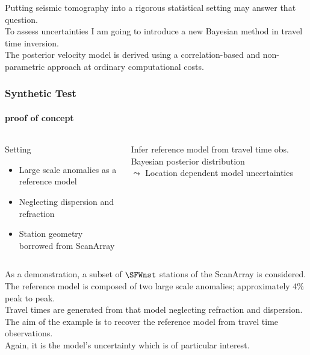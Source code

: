 \documentclass[aspectratio=169, t, 10pt,
    ]{beamer}
\begin{document}
Putting seismic tomography into a rigorous statistical setting may answer that question.
\\
To assess uncertainties I am going to introduce a new Bayesian method in travel time inversion.
\\
The posterior velocity model is derived using a correlation-based and non-parametric approach at ordinary computational costs.


\begin{frame}
    \frametitle{Synthetic Test}
    \framesubtitle{proof of concept}%
%
\begin{columns}%
%
%

    \begin{exampleblock}{Setting}
        \begin{itemize}
            \item Large scale anomalies as a reference model
            \item Neglecting dispersion and refraction
            \item Station geometry borrowed from ScanArray
        \end{itemize}
    \end{exampleblock}
    \medskip

    \begin{alertblock}{Infer reference model from travel time obs.}
        Bayesian posterior distribution \\
        \hfill {\large $\leadsto$} Location dependent model uncertainties ~
    \end{alertblock}

    \vspace{-10mm}
    
\end{columns}

\end{frame}

As a demonstration, a subset of $\SFWnst$ stations of the ScanArray is considered.
\\
The reference model is composed of two large scale anomalies; approximately 4\% peak to peak.
\\
Travel times are generated from that model neglecting refraction and dispersion.
\\
The aim of the example is to recover the reference model from travel time observations.
\\
Again, it is the model's uncertainty which is of particular interest.
\end{document}
